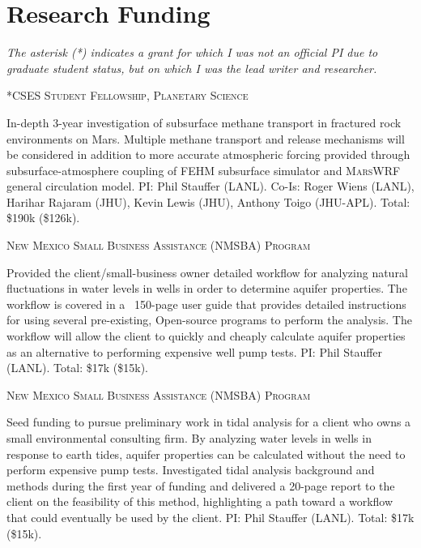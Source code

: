 \documentclass[11pt, letterpaper]{article}
\newcommand{\years}[1]{\marginnote{\scriptsize #1}}
\begin{document}
\section*{Research Funding}
\label{sec:funding}
\noindent
\emph{The asterisk (*) indicates a grant for which I was not an official PI due
to graduate student status, but on which I was the lead writer and researcher.}

\years{2021}\textsc{*CSES Student Fellowship, Planetary Science}
\begin{adjustwidth}{5pt}{0pt}
	In-depth 3-year investigation of subsurface methane transport in fractured rock
	environments on Mars. Multiple methane transport and release mechanisms 
	will be considered in addition to more accurate atmospheric forcing
	provided through subsurface-atmosphere coupling of \textsc{FEHM} subsurface
	simulator and \textsc{MarsWRF} general circulation model. 
	PI: Phil Stauffer (LANL). Co-Is: Roger Wiens (LANL), Harihar Rajaram (JHU),
	Kevin Lewis (JHU), Anthony Toigo (JHU-APL). Total: \$190k (\$126k). 
\end{adjustwidth}

\years{2021}\textsc{New Mexico Small Business Assistance (NMSBA) Program}
\begin{adjustwidth}{5pt}{0pt}
	Provided the client/small-business owner detailed workflow for analyzing
	natural fluctuations in water levels in wells in order to determine aquifer
	properties. The workflow is covered in a ~150-page user guide that provides
	detailed instructions for using several pre-existing, Open-source programs
	to perform the analysis. The workflow will allow the client to quickly and
	cheaply calculate aquifer properties as an alternative to performing
	expensive well pump tests.
	PI: Phil Stauffer (LANL). Total: \$17k (\$15k). 
\end{adjustwidth}

\years{2020}\textsc{New Mexico Small Business Assistance (NMSBA) Program}
\begin{adjustwidth}{5pt}{0pt}
	Seed funding to pursue preliminary work in tidal analysis for a client who
	owns a small environmental consulting firm. By analyzing water levels in
	wells in response to earth tides, aquifer properties can be calculated
	without the need to perform expensive pump tests.  Investigated tidal
	analysis background and methods during the first year of funding and
	delivered a 20-page report to the client on the feasibility of this method,
	highlighting a path toward a workflow that could eventually be used by the
	client.   
	PI: Phil Stauffer (LANL). Total: \$17k (\$15k). 
\end{adjustwidth}
\end{document}
